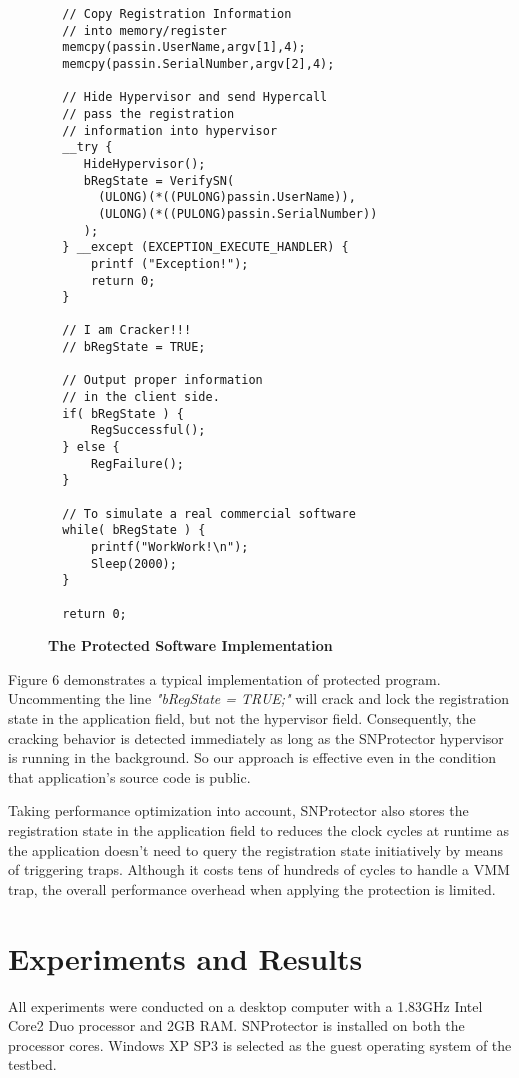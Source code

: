 \documentclass[conference]{IEEEtran}
\begin{document}
{\begin{figure}
\begin{lstlisting}
  // Copy Registration Information
  // into memory/register
  memcpy(passin.UserName,argv[1],4);
  memcpy(passin.SerialNumber,argv[2],4);

  // Hide Hypervisor and send Hypercall
  // pass the registration
  // information into hypervisor
  __try {
     HideHypervisor();
     bRegState = VerifySN(
       (ULONG)(*((PULONG)passin.UserName)),
       (ULONG)(*((PULONG)passin.SerialNumber))
     );
  } __except (EXCEPTION_EXECUTE_HANDLER) {
      printf ("Exception!");
      return 0;
  }

  // I am Cracker!!!
  // bRegState = TRUE;

  // Output proper information
  // in the client side.
  if( bRegState ) {
      RegSuccessful();
  } else {
      RegFailure();
  }

  // To simulate a real commercial software
  while( bRegState ) {
      printf("WorkWork!\n");
      Sleep(2000);
  }

  return 0;
\end{lstlisting}
\caption{{\bf The Protected Software Implementation}}
\label{Figure 10.}
\end{figure}

Figure 6 demonstrates a typical implementation of protected
program. Uncommenting the line \emph{"bRegState = TRUE;"} will
crack and lock the registration state in the application field,
but not the hypervisor field. Consequently, the cracking behavior
is detected immediately as long as the SNProtector hypervisor is
running in the background. So our approach is effective even in
the condition that application's source code is public.

Taking performance optimization into account, SNProtector also
stores the registration state in the application field to reduces
the clock cycles at runtime as the application doesn't need to
query the registration state initiatively by means of triggering
traps. Although it costs tens of hundreds of cycles to handle a
VMM trap, the overall performance overhead when applying the
protection is limited.

\bigskip

\section{Experiments and Results}
All experiments were conducted on a desktop computer with a
1.83GHz Intel Core2 Duo processor and 2GB RAM. SNProtector is
installed on both the processor cores. Windows XP SP3 is selected
as the guest operating system of the testbed.

}
\end{document}
